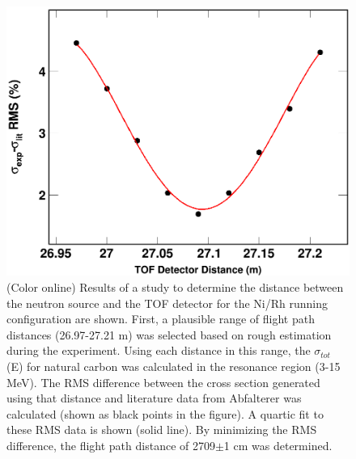 \documentclass[twocolumn,secnumarabic,amssymb, nobibnotes, aps, prl,
superscriptaddress, nobalancelastpage]{revtex4}
\newcommand{\totEs}{\ensuremath{\sigma_{tot}}(E)\,\,}
\begin{document}
\begin{figure}
    \includegraphics[scale=0.3]{figures/DistanceStudyNi.png}
    \caption{(Color online) Results of a study to determine the distance between
    the neutron source and the TOF detector for the Ni/Rh running configuration
are shown. First, a plausible range of flight path distances (26.97-27.21 m) was
selected based on rough estimation during the experiment. Using each
distance in this range, the \totEs for natural carbon was calculated in the
resonance region (3-15 MeV). The RMS difference between the cross section
generated using that distance and literature data from Abfalterer
\cite{Abfalterer2000, Abfalterer2001} was calculated (shown as black points in
the figure). A quartic fit to these RMS data is shown (solid line). By minimizing the
RMS difference, the flight path distance of 2709$\pm$1 cm was determined.}
    \label{DistanceStudy}
\end{figure}
\end{document}
